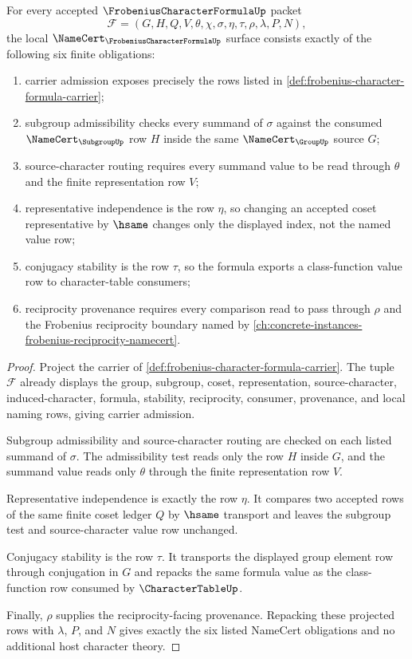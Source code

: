 \begin{theorem}
\label{thm:frobenius-character-formula-namecert-obligations}
For every accepted $\FrobeniusCharacterFormulaUp$ packet
$$
\mathcal{F}=(G,H,Q,V,\theta,\chi,\sigma,\eta,\tau,\rho,\lambda,P,N),
$$
the local $\NameCert_{\FrobeniusCharacterFormulaUp}$ surface consists exactly of the following six finite obligations:
\begin{enumerate}
\item carrier admission exposes precisely the rows listed in \autoref{def:frobenius-character-formula-carrier};
\item subgroup admissibility checks every summand of $\sigma$ against the consumed $\NameCert_{\SubgroupUp}$ row $H$ inside the same $\NameCert_{\GroupUp}$ source $G$;
\item source-character routing requires every summand value to be read through $\theta$ and the finite representation row $V$;
\item representative independence is the row $\eta$, so changing an accepted coset representative by $\hsame$ changes only the displayed index, not the named value row;
\item conjugacy stability is the row $\tau$, so the formula exports a class-function value row to character-table consumers;
\item reciprocity provenance requires every comparison read to pass through $\rho$ and the Frobenius reciprocity boundary named by \autoref{ch:concrete-instances-frobenius-reciprocity-namecert}.
\end{enumerate}
\end{theorem}
\begin{proof}
Project the carrier of \autoref{def:frobenius-character-formula-carrier}. The tuple $\mathcal{F}$ already displays the group, subgroup, coset, representation, source-character, induced-character, formula, stability, reciprocity, consumer, provenance, and local naming rows, giving carrier admission.

Subgroup admissibility and source-character routing are checked on each listed summand of $\sigma$. The admissibility test reads only the row $H$ inside $G$, and the summand value reads only $\theta$ through the finite representation row $V$.

Representative independence is exactly the row $\eta$. It compares two accepted rows of the same finite coset ledger $Q$ by $\hsame$ transport and leaves the subgroup test and source-character value row unchanged.

Conjugacy stability is the row $\tau$. It transports the displayed group element row through conjugation in $G$ and repacks the same formula value as the class-function row consumed by $\CharacterTableUp$.

Finally, $\rho$ supplies the reciprocity-facing provenance. Repacking these projected rows with $\lambda$, $P$, and $N$ gives exactly the six listed NameCert obligations and no additional host character theory.
\end{proof}

